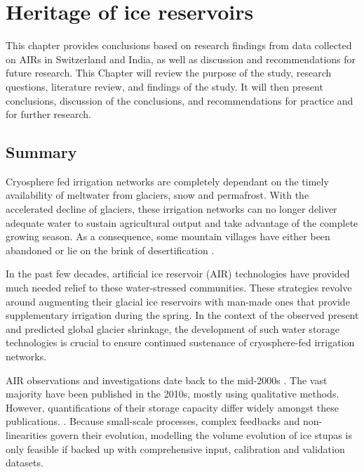 \chapter{Heritage of ice reservoirs}


This chapter provides conclusions based on research findings from data collected on AIRs in Switzerland and India,
as well as discussion and recommendations for future research. This Chapter will review the purpose of the
study, research questions, literature review, and findings of the study. It will then present conclusions,
discussion of the conclusions, and recommendations for practice and for further research.

\section{Summary}

Cryosphere fed irrigation networks are completely dependant on the timely availability of meltwater from
glaciers, snow and permafrost. With the accelerated decline of glaciers, these irrigation networks can no longer
deliver adequate water to sustain agricultural output and take advantage of the complete growing season. As a
consequence, some mountain villages have either been abandoned or lie on the brink of desertification
\cite{grossmanHimalayanGlaciersMelt2015}.

In the past few decades, artificial ice reservoir (AIR) technologies have provided much needed relief to these
water-stressed communities. These strategies revolve around augmenting their glacial ice reservoirs with
man-made ones that provide supplementary irrigation during the spring. In the context of the observed present
and predicted global glacier shrinkage, the development of such water storage technologies is crucial to ensure
continued sustenance of cryosphere-fed irrigation networks.

AIR observations and investigations date back to the mid-2000s \cite{tveitenGlacierGrowingLocal2007}. The vast
majority have been published in the 2010s, mostly using qualitative methods. However, quantifications of their
storage capacity differ widely amongst these publications. \citep{baglaArtificialGlaciersHelp1998,
norphelSnowWaterHarvesting2015, nusserSociohydrologyArtificialGlaciers2019}. Because small-scale processes,
complex feedbacks and non-linearities govern their evolution, modelling the volume evolution of ice stupas is
only feasible if backed up with comprehensive input, calibration and validation datasets.

